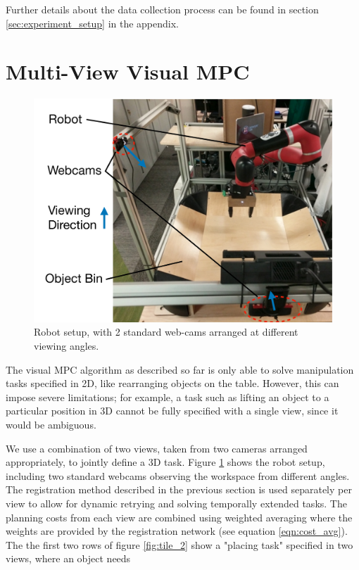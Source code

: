 Further details about the data collection process can be found in section \ref{sec:experiment_setup} in the appendix.

\section{Multi-View Visual MPC}
\label{sec:multiview}
\begin{figure}
	\centering
	\includegraphics[width=0.45\columnwidth]{images_general/robot_setup_scheme.pdf}
	\caption{\small{Robot setup, with 2 standard web-cams arranged at different viewing angles.}}	\label{fig:robot_setup}
\end{figure}

The visual MPC algorithm as described so far is only able to solve manipulation tasks specified in 2D, like rearranging objects on the table. However, this can impose severe limitations; for example, a task such as lifting an object to a particular position in 3D cannot be fully specified with a single view, since it would be ambiguous. 

We use a combination of two views, taken from two cameras arranged appropriately, to jointly define a 3D task. Figure \ref{fig:robot_setup} shows the robot setup, including two standard webcams observing the workspace from different angles. The registration method described in the previous section is used separately per view to allow for dynamic retrying and solving temporally extended tasks. The planning costs from each view are combined using weighted averaging where the weights are provided by the registration network (see equation \ref{eqn:cost_avg}).  The the first two rows of figure \ref{fig:tile_2} show a "placing task" specified in two views, where an object needs 





